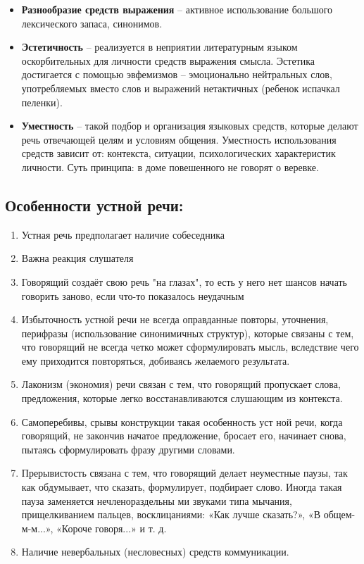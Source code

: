 \begin{itemize}
    \item \textbf{Разнообразие средств выражения} – активное использование большого лексического запаса, синонимов.
    \item \textbf{Эстетичность }– реализуется в неприятии литературным языком оскорбительных для личности средств выражения смысла. Эстетика достигается с помощью эвфемизмов – эмоционально нейтральных слов, употребляемых вместо слов и выражений нетактичных (ребенок испачкал пеленки).
    \item \textbf{Уместность} – такой подбор и организация языковых средств, которые делают речь отвечающей целям и условиям общения. Уместность использования средств зависит от: контекста, ситуации, психологических характеристик личности. Суть принципа: в доме повешенного не говорят о веревке.
\end{itemize}

\subsection*{Особенности устной речи:}
\begin{enumerate}
    \item Устная речь предполагает наличие собеседника
    \item Важна реакция слушателя
    \item Говорящий создаёт свою речь "на глазах", то есть у него нет шансов начать говорить заново, если что-то показалось неудачным
    \item Избыточность устной речи не всегда оправданные повторы, уточнения, перифразы (использование синонимичных структур), которые связаны с тем, что говорящий не всегда четко может сформулировать мысль, вследствие чего ему приходится повторяться, добиваясь желаемого результата.

    \item Лаконизм (экономия) речи связан с тем, что говорящий пропускает слова, предложения, которые легко восстанавливаются слушающим из контекста.

    \item Самоперебивы, срывы конструкции такая особенность уст ной речи, когда говорящий, не закончив начатое предложение, бросает его, начинает снова, пытаясь сформулировать фразу другими словами.
    
    \item Прерывистость связана с тем, что говорящий делает неуместные паузы, так как обдумывает, что сказать, формулирует, подбирает слово. Иногда такая пауза заменяется нечленораздельны ми звуками типа мычания, прищелкиванием пальцев, восклицаниями: «Как лучше сказать?», «В общем-м-м...», «Короче говоря...» и т. д.
    
    \item Наличие невербальных (несловесных) средств коммуникации. 
\end{enumerate}
